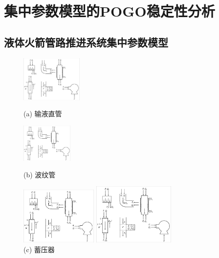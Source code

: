 
\chapter{集中参数模型的POGO稳定性分析}

\section{液体火箭管路推进系统集中参数模型}
\label{sec:Lumped-Feedline-Model}
\begin{figure}[!htb]
	\centering
	\begin{minipage}[b]{0.3\textwidth}
		\centering
		\includegraphics[width=1.2in]{Straight-Tube.pdf}
		\caption*{(a) 输液直管}
	\end{minipage}
	\centering
	\begin{minipage}[b]{0.3\textwidth}
		\centering
		\includegraphics[width=1in]{Bellow.pdf}
		\caption*{(b) 波纹管}
	\end{minipage}
	\centering
	\begin{minipage}[b]{0.3\textwidth}
		\centering
		\includegraphics[width=1.5in]{Accumulator.pdf}
		\caption*{(c) 蓄压器}
	\end{minipage}
	\centering
	\begin{minipage}[b]{0.3\textwidth}
		\centering
		\includegraphics[width=1.6in]{Thrust.pdf}

\end{minipage}
\end{figure}
